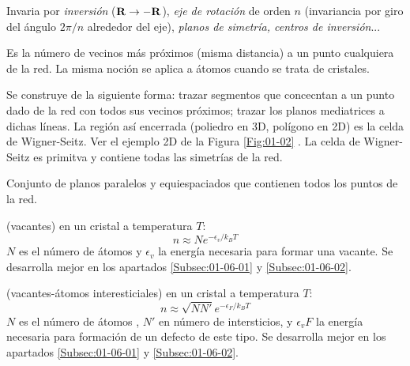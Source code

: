 \begin{definition}
    Invaria por {\it inversión} ($\mathbf{R} \rightarrow - \mathbf{R}$), {\it eje de rotación} de orden $n$ (invariancia por giro del ángulo $2\pi/n$ alrededor del eje), {\it planos de simetría, centros de inversión}...    
\end{definition}

\begin{definition}
    Es la número de vecinos más próximos (misma distancia) a un punto cualquiera de la red. La misma noción se aplica a átomos cuando se trata de cristales.
\end{definition}

\begin{definition}
    Se construye de la siguiente forma: trazar segmentos que concecntan a un punto dado de la red con todos sus vecinos próximos; trazar los planos mediatrices a dichas líneas. La región así encerrada (poliedro en 3D, polígono en 2D) es la celda de Wigner-Seitz. Ver el ejemplo 2D de la Figura \ref{Fig:01-02} . La celda de Wigner-Seitz es primitva y contiene todas las simetrías de la red.    
\end{definition}
\begin{definition}
    Conjunto de planos paralelos y equiespaciados que contienen todos los puntos de la red. 
\end{definition}


\begin{definition}
    (vacantes) en un cristal a temperatura $T$:
    \begin{equation}
    n \approx N e^{-\epsilon_v /k_B T}
    \end{equation}
    $N$ es el número de átomos y $\epsilon_v$ la energía necesaria para formar una vacante. Se desarrolla mejor en los apartados \ref{Subsec:01-06-01} y \ref{Subsec:01-06-02}.
\end{definition}


\begin{definition}
    (vacantes-átomos interesticiales) en un cristal a temperatura $T$:
    \begin{equation}
    n \approx \sqrt{NN'} e^{-\epsilon_F /k_B T}
    \end{equation}
    $N$ es el número de átomos , $N'$ en número de intersticios, y $\epsilon_vF$ la energía necesaria para formación de un defecto de este tipo. Se desarrolla mejor en los apartados \ref{Subsec:01-06-01} y \ref{Subsec:01-06-02}.
\end{definition}
    

